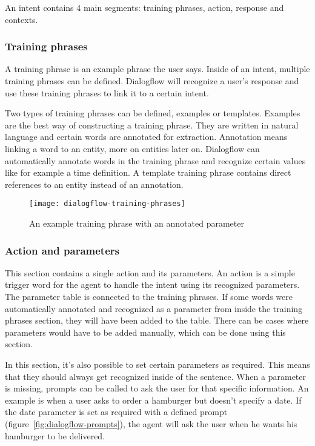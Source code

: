 An intent contains 4 main segments: training phrases, action, response and contexts.

\subsubsection{Training phrases}

A training phrase is an example phrase the user says. Inside of an intent, multiple training phrases can be defined. Dialogflow will recognize a user's response and use these training phrases to link it to a certain intent.

Two types of training phrases can be defined, examples or templates. Examples are the best way of constructing a training phrase. They are written in natural language and certain words are annotated for extraction. Annotation means linking a word to an entity, more on entities later on. Dialogflow can automatically annotate words in the training phrase and recognize certain values like for example a time definition. A template training phrase contains direct references to an entity instead of an annotation.

\begin{figure}[ht]
	\centering
	\texttt{[image: dialogflow-training-phrases]}\label{fig:dialogflow-training-phrases}
	\caption{An example training phrase with an annotated parameter}
\end{figure}

\subsubsection{Action and parameters}

This section contains a single action and its parameters. An action is a simple trigger word for the agent to handle the intent using its recognized parameters. The parameter table is connected to the training phrases. If some words were automatically annotated and recognized as a parameter from inside the training phrases section, they will have been added to the table. There can be cases where parameters would have to be added manually, which can be done using this section.

In this section, it's also possible to set certain parameters as required. This means that they should always get recognized inside of the sentence. When a parameter is missing, prompts can be called to ask the user for that specific information. An example is when a user asks to order a hamburger but doesn't specify a date. If the date parameter is set as required with a defined prompt (figure~\ref{fig:dialogflow-prompts}), the agent will ask the user when he wants his hamburger to be delivered.

